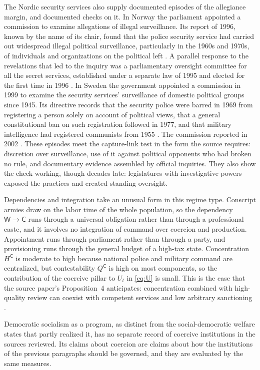 \documentclass[11pt,letterpaper]{article}
\theoremstyle{definition}
\theoremstyle{remark}
\newcommand{\pC}{\mathsf{C}}
\newcommand{\pW}{\mathsf{W}}
\begin{document}
The Nordic security services also supply documented episodes of the allegiance margin, and documented checks on it. In Norway the parliament appointed a commission to examine allegations of illegal surveillance. Its report of 1996, known by the name of its chair, found that the police security service had carried out widespread illegal political surveillance, particularly in the 1960s and 1970s, of individuals and organizations on the political left \citep{eos2026}. A parallel response to the revelations that led to the inquiry was a parliamentary oversight committee for all the secret services, established under a separate law of 1995 and elected for the first time in 1996 \citep{eos2026}. In Sweden the government appointed a commission in 1999 to examine the security services' surveillance of domestic political groups since 1945. Its directive records that the security police were barred in 1969 from registering a person solely on account of political views, that a general constitutional ban on such registration followed in 1977, and that military intelligence had registered communists from 1955 \citep{dir1999}. The commission reported in 2002 \citep{sou2002}. These episodes meet the capture-link test in the form the source requires: discretion over surveillance, use of it against political opponents who had broken no rule, and documentary evidence assembled by official inquiries. They also show the check working, though decades late: legislatures with investigative powers exposed the practices and created standing oversight.

Dependencies and integration take an unusual form in this regime type. Conscript armies draw on the labor time of the whole population, so the dependency $\pW \to \pC$ runs through a universal obligation rather than through a professional caste, and it involves no integration of command over coercion and production. Appointment runs through parliament rather than through a party, and provisioning runs through the general budget of a high-tax state. Concentration $H^{\pC}$ is moderate to high because national police and military command are centralized, but contestability $Q^{\pC}$ is high on most components, so the contribution of the coercive pillar to $U_t$ in \eqref{eq:U} is small. This is the case that the source paper's Proposition~4 anticipates: concentration combined with high-quality review can coexist with competent services and low arbitrary sanctioning \citep{largo2026hbs}.

Democratic socialism as a program, as distinct from the social-democratic welfare states that partly realized it, has no separate record of coercive institutions in the sources reviewed. Its claims about coercion are claims about how the institutions of the previous paragraphs should be governed, and they are evaluated by the same measures.
\end{document}
